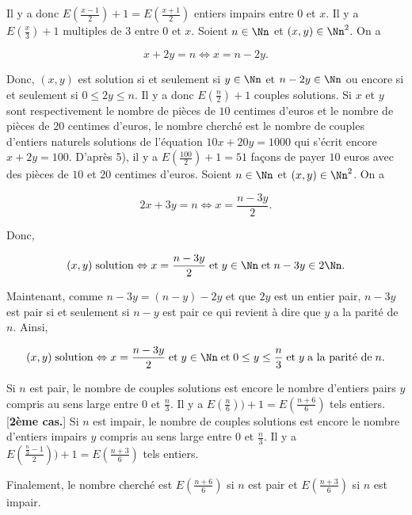 {\begin{enumerate}
{Il y a donc $E(\frac{x-1}{2})+1=E(\frac{x+1}{2})$ entiers impairs entre $0$ et $x$.
Il y a $E(\frac{x}{3})+1$ multiples de $3$ entre $0$ et $x$.
Soient $n\in\Nn$ et $(x,y)\in\Nn^2$. On a

$$x+2y=n\Leftrightarrow x=n-2y.$$

Donc, $(x,y)$ est solution si et seulement si $y\in\Nn$ et $n-2y\in\Nn$ ou encore si et seulement si $0\leq2y\leq n$.
Il y a donc $E(\frac{n}{2})+1$ couples solutions.
Si $x$ et $y$ sont respectivement le nombre de pièces de $10$ centimes d'euros et le nombre de pièces de $20$
centimes d'euros, le nombre cherché est le nombre de couples d'entiers naturels solutions de l'équation $10x+20y=1000$
qui s'écrit encore $x+2y=100$. D'après 5), il y a $E(\frac{100}{2})+1=51$ façons de payer $10$ euros avec des pièces de
$10$ et $20$ centimes d'euros.
Soient $n\in\Nn$ et $(x,y)\in\Nn^2$. On a

$$2x+3y=n\Leftrightarrow x=\frac{n-3y}{2}.$$

Donc,

$$(x,y)\;\mbox{solution}\Leftrightarrow x=\frac{n-3y}{2}\;\mbox{et}\;y\in\Nn\;\mbox{et}\;n-3y\in2\Nn.$$

Maintenant, comme $n-3y=(n-y)-2y$ et que $2y$ est un entier pair, $n-3y$ est pair si et seulement si $n-y$ est pair ce
qui revient à dire que $y$ a la parité de $n$. Ainsi,

$$(x,y)\;\mbox{solution}\Leftrightarrow x=\frac{n-3y}{2}\;\mbox{et}\;y\in\Nn\;\mbox{et}\;0\leq y\leq
\frac{n}{3}\;\mbox{et}\;y\;\mbox{a la parité de}\;n.$$

\begin{itemize}
 Si $n$ est pair, le nombre de couples solutions est encore le nombre d'entiers pairs $y$
compris au sens large entre $0$ et $\frac{n}{3}$. Il y a $E(\frac{n}{6}))+1=E(\frac{n+6}{6})$ tels entiers.
[\textbf{2ème cas.}] Si $n$ est impair, le nombre de couples solutions est encore le nombre d'entiers impairs $y$
compris au sens large entre $0$ et $\frac{n}{3}$. Il y a  $E(\frac{\frac{n}{3}-1}{2}))+1=E(\frac{n+3}{6})$ tels
entiers.
\end{itemize}
Finalement, le nombre cherché est $E(\frac{n+6}{6})$ si $n$ est pair et $E(\frac{n+3}{6})$ si $n$ est impair.
}
\end{enumerate}
}
